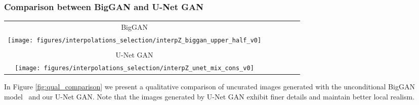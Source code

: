 \documentclass[10pt,twocolumn,letterpaper]{article}
\begin{document}
\subsubsection*{Comparison between BigGAN and U-Net GAN}
\begin{figure*}
\begin{centering}
\setlength{\tabcolsep}{0.1em}
\renewcommand{\arraystretch}{1.0}
\par\end{centering}
\begin{centering}
\hfill{}\begin{tabular}{c@{\hskip 0.05in}c@{\hskip 0.05in}c@{\hskip 0.05in}c@{\hskip 0.05in}c@{\hskip 0.05in}c}
 
BigGAN \tabularnewline
\texttt{[image: figures/interpolations\_selection/interpZ\_biggan\_upper\_half\_v0]}\tabularnewline
\tabularnewline
U-Net GAN \tabularnewline
\texttt{[image: figures/interpolations\_selection/interpZ\_unet\_mix\_cons\_v0]}

\end{tabular}\hfill{}
\par\end{centering}
\caption{\label{fig:qual_comparison} Qualitative comparison of uncurated images generated with the unconditional BigGAN model (top) and our U-Net GAN (bottom) on FFHQ with resolution . Note that the images generated by U-Net GAN exhibit finer details and maintain better local realism.} \vspace{0em}
\end{figure*}
 In Figure \ref{fig:qual_comparison} we present a qualitative comparison of uncurated images generated with the unconditional BigGAN model~\cite{Brock2019} and our U-Net GAN. Note that the images generated by U-Net GAN exhibit finer details and maintain better local realism.
\end{document}
